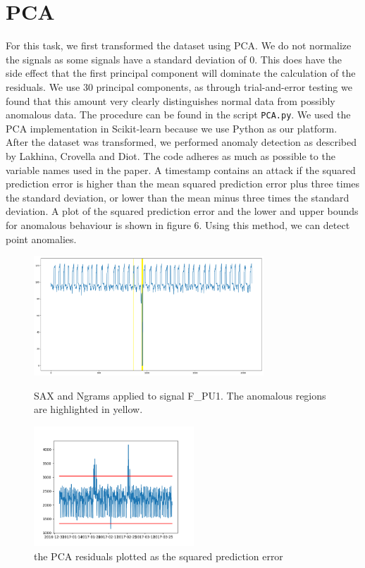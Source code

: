\documentclass[]{article}
\begin{document}
\section{PCA}
For this task, we first transformed the dataset using PCA. We do not normalize the signals as some signals have a standard deviation of 0. This does have the side effect that the first principal component will dominate the calculation of the residuals. We use 30 principal components, as through trial-and-error testing we found that this amount very clearly distinguishes normal data from possibly anomalous data. The procedure can be found in the script \texttt{PCA.py}. We used the PCA implementation in Scikit-learn because we use Python as our platform. After the dataset was transformed, we performed anomaly detection as described by Lakhina, Crovella and Diot\cite{lakhina2004diagnosing}. The code adheres as much as possible to the variable names used in the paper. A timestamp contains an attack if the squared prediction error is higher than the mean squared prediction error plus three times the standard deviation, or lower than the mean minus three times the standard deviation. A plot of the squared prediction error and the lower and upper bounds for anomalous behaviour is shown in figure 6. Using this method, we can detect point anomalies.
\begin{center}
	\begin{figure}[H]
		\begin{minipage}{.475\textwidth}
			\includegraphics[width=1\linewidth, height=4.5cm]{./visuallizations/SAX_anomaly.png}
			\caption{SAX and Ngrams applied to signal F\_PU1. The anomalous regions are highlighted in yellow.}
			\label{predictions}
		\end{minipage}
		\begin{minipage}{.475\textwidth}
			\includegraphics[width=1\linewidth, height=4.5cm]{./visuallizations/PCA_residuals.png}
			\caption{the PCA residuals plotted as the squared prediction error}
			\label{PCA}
		\end{minipage} %
	\end{figure}
\end{center}
\clearpage
\end{document}
